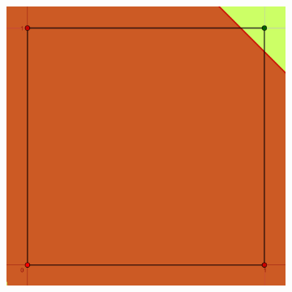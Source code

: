 \documentclass[
  us-letterpaper,
]{scrreprt}
\theoremstyle{plain}
\theoremstyle{definition}
\theoremstyle{definition}
\theoremstyle{plain}
\theoremstyle{remark}
\begin{document}
\begin{figure}
\begin{minipage}{0.33\linewidth}
{\begin{figure}[H]
{\centering \includegraphics{Imagenes/and.png}

}


\end{figure}%

}

\subcaption{\label{fig-and}}

\end{minipage}%
%
\begin{minipage}{0.33\linewidth}

\centering{

\captionsetup{labelsep=none}

\begin{figure}[H]


\end{figure}}
\end{minipage}
\end{figure}
\end{document}
